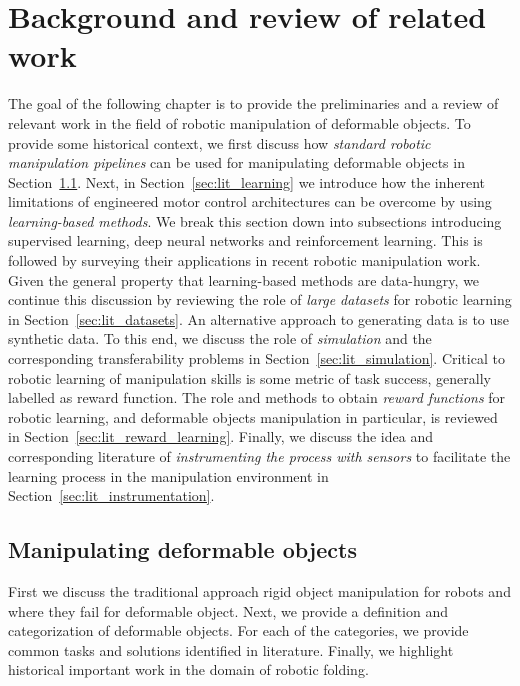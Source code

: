 \documentclass[\home/main.tex]{subfiles}
\begin{document}
\chapter{Background and review of related work} \label{ch:lit}

The goal of the following chapter is to provide the preliminaries and a review of relevant work in the field of robotic manipulation of deformable objects. To provide some historical context, we first discuss how \emph{standard robotic manipulation pipelines} can be used for manipulating deformable objects in Section~\ref{sec:lit_traditional}. Next, in Section~\ref{sec:lit_learning} we introduce how the inherent limitations of engineered motor control architectures can be overcome by using \emph{learning-based methods}. We break this section down into subsections introducing supervised learning, deep neural networks and reinforcement learning. This is followed by surveying their applications in recent robotic manipulation work. Given the general property that learning-based methods are data-hungry, we continue this discussion by reviewing the role of \emph{large datasets} for robotic learning in Section~\ref{sec:lit_datasets}. An alternative approach to generating data is to use synthetic data. To this end, we discuss the role of \emph{simulation} and the corresponding transferability problems in Section~\ref{sec:lit_simulation}. Critical to robotic learning of manipulation skills is some metric of task success, generally labelled as reward function. The role and methods to obtain \emph{reward functions} for robotic learning, and deformable objects manipulation in particular, is reviewed in Section~\ref{sec:lit_reward_learning}. Finally, we discuss the idea and corresponding literature of \emph{instrumenting the process with sensors} to facilitate the learning process in the manipulation environment in Section~\ref{sec:lit_instrumentation}.


\section{Manipulating deformable objects} \label{sec:lit_traditional}

First we discuss the traditional approach rigid object manipulation for robots and where they fail for deformable object. Next, we provide a definition and categorization of deformable objects. For each of the categories, we provide common tasks and solutions identified in literature. Finally, we highlight historical important work in the domain of robotic folding. 
\end{document}
